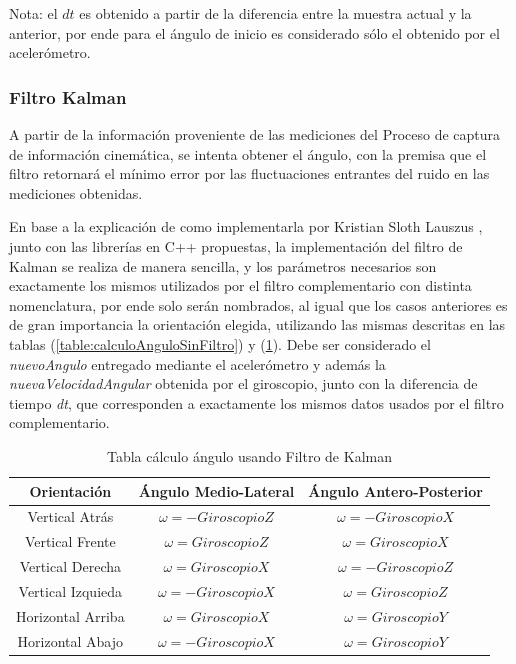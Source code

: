 \documentclass[12pt,a4paper]{article}
\begin{document}
Nota: el $dt$ es obtenido a partir de la diferencia entre la muestra actual y la anterior, por ende para el ángulo de inicio es considerado sólo el obtenido por el acelerómetro.

\subsubsection{Filtro Kalman}
A partir de la información proveniente de las mediciones del Proceso de captura de información cinemática, se intenta obtener el ángulo, con la premisa que el filtro retornará el mínimo error por las fluctuaciones entrantes del ruido en las mediciones obtenidas.

En base a la explicación de como implementarla por Kristian Sloth Lauszus
\cite{kalmanTKJ}, junto con las librerías en C++ propuestas, la implementación del filtro de Kalman se realiza de manera sencilla, y los parámetros necesarios son exactamente los mismos utilizados por el filtro complementario con distinta nomenclatura, por ende solo serán nombrados, al igual que los casos anteriores es de gran importancia la orientación elegida, utilizando las mismas descritas en las tablas (\ref{table:calculoAnguloSinFiltro}) y (\ref{table:calculoAnguloFiltroKalman}).
Debe ser considerado el \textit{nuevoAngulo} entregado mediante el acelerómetro y además la \textit{nuevaVelocidadAngular} obtenida por el giroscopio, junto con la diferencia de tiempo \textit{dt}, que corresponden a exactamente los mismos datos usados por el filtro complementario.
\begin{table}[H]
	\centering
	\begin{tabular}{|c|c|c|}
		\hline 
		\textbf{Orientación} & \textbf{Ángulo Medio-Lateral} & \textbf{Ángulo Antero-Posterior} \\ 
		\hline 
		Vertical Atrás & $\omega= -GiroscopioZ$ &  $\omega= -GiroscopioX$ \\ 
		\hline 
		Vertical Frente & $\omega= GiroscopioZ$ &  $\omega= GiroscopioX$ \\
		\hline 
		Vertical Derecha & $\omega= GiroscopioX$ &  $\omega= -GiroscopioZ$ \\ 
		\hline 
		Vertical Izquieda & $\omega= -GiroscopioX$ &  $\omega= GiroscopioZ$ \\ 
		\hline 
		Horizontal Arriba & $\omega= GiroscopioX$ &  $\omega= GiroscopioY$ \\ 
		\hline 
		Horizontal Abajo & $\omega= -GiroscopioX$ &  $\omega= GiroscopioY$ \\ 
		\hline 
	\end{tabular}
	\caption{Tabla cálculo ángulo usando Filtro de Kalman} 
	\label{table:calculoAnguloFiltroKalman}
\end{table}
\end{document}
